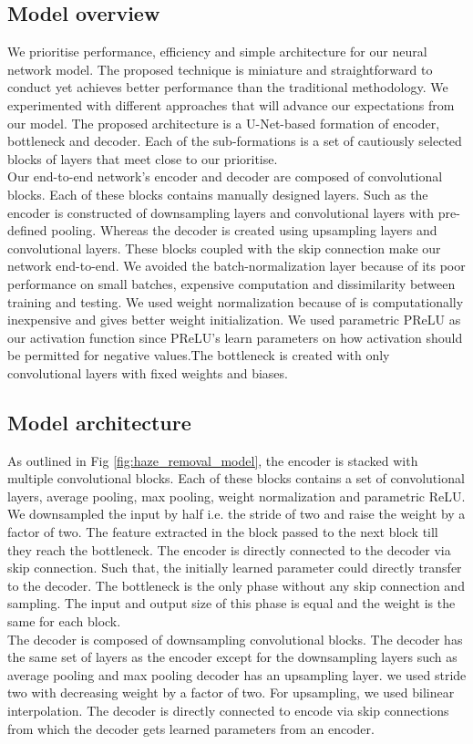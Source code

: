 \subsection{Model overview}\label{model_overview}
We prioritise performance, efficiency and simple architecture for our neural network model. The proposed technique is miniature and straightforward to conduct yet achieves better performance than the traditional methodology. We experimented with different approaches that will advance our expectations from our model. The proposed architecture is a U-Net-based formation of encoder, bottleneck and decoder. Each of the sub-formations is a set of cautiously selected blocks of layers that meet close to our prioritise. 
\\
Our end-to-end network's encoder and decoder are composed of convolutional blocks. Each of these blocks contains manually designed layers. Such as the encoder is constructed of downsampling layers and convolutional layers with pre-defined pooling. Whereas the decoder is created using upsampling layers and convolutional layers. These blocks coupled with the skip connection make our network end-to-end. We avoided the batch-normalization layer because of its poor performance on small batches, expensive computation and dissimilarity between training and testing. We used weight normalization because of is computationally inexpensive and gives better weight initialization. We used parametric  PReLU as our activation function since PReLU's learn parameters on how activation should be permitted for negative values.The bottleneck is created with only convolutional layers with fixed weights and biases. 
\subsection{Model architecture}\label{model_arch}
As outlined in Fig \eqref{fig:haze_removal_model}, the encoder is stacked with multiple convolutional blocks. Each of these blocks contains a set of convolutional layers, average pooling, max pooling, weight normalization and parametric ReLU. We downsampled the input by half i.e. the stride of two and raise the weight by a factor of two. The feature extracted in the block passed to the next block till they reach the bottleneck. The encoder is directly connected to the decoder via skip connection. Such that, the initially learned parameter could directly transfer to the decoder. The bottleneck is the only phase without any skip connection and sampling.  The input and output size of this phase is equal and the weight is the same for each block. 
\\
The decoder is composed of downsampling convolutional blocks. The decoder has the same set of layers as the encoder except for the downsampling layers such as average pooling and max pooling decoder has an upsampling layer. we used stride two with decreasing weight by a factor of two. For upsampling, we used bilinear interpolation. The decoder is directly connected to encode via skip connections from which the decoder gets learned parameters from an encoder.


